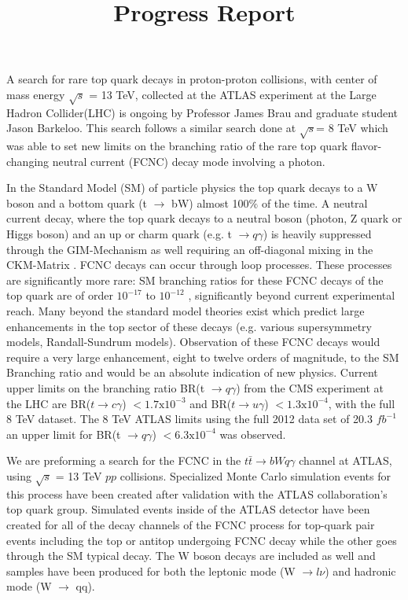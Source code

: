\documentclass[12pt,letterpaper]{article}
\begin{document}
\title{Progress Report}  \date{\vspace{-8ex}}

\maketitle

\par A search for rare top quark decays in proton-proton collisions,  with center of mass energy $\sqrt{s}$ = 13 TeV, collected at the ATLAS experiment at the Large Hadron Collider(LHC) is ongoing by Professor James Brau and graduate student Jason Barkeloo.  This search follows a similar search done at $\sqrt{s}$= 8 TeV which was able to set new limits on the branching ratio of the rare top quark flavor-changing neutral current (FCNC) decay mode involving a photon.

\par In the Standard Model (SM) of particle physics the top quark decays to a W boson and a bottom quark (t $\rightarrow$ bW) almost 100$\%$ of the time. A neutral current decay, where the top quark decays to a neutral boson (photon, Z quark or Higgs boson) and an up or charm quark (e.g. t $\rightarrow q\gamma$) is heavily suppressed through the GIM-Mechanism \cite{gim} as well requiring an off-diagonal mixing in the CKM-Matrix \cite{ckm}.   FCNC decays can occur through loop processes.  These processes are significantly more rare: SM branching ratios for these FCNC decays of the top quark are of order $ 10^{-17}$ to $10^{-12}$ \cite{snowmass}, significantly beyond current experimental reach.  Many beyond the standard model theories exist which predict large enhancements in the top sector of these decays (e.g. various supersymmetry models, Randall-Sundrum models).  Observation of these FCNC decays would require a very large enhancement, eight to twelve orders of magnitude, to the SM Branching ratio and would be an absolute indication of new physics.  Current upper limits on the branching ratio BR(t $\rightarrow q\gamma$) from the CMS experiment at the LHC are BR($t \rightarrow c\gamma$) $< 1.7\text{x}10^{-3}$ and BR($t \rightarrow u\gamma$) $< 1.3\text{x} 10^{-4}$, with the full 8 TeV dataset\cite{cms}.  The 8 TeV ATLAS limits using the full 2012 data set of 20.3 $fb^{-1}$ an upper limit for  BR(t $\rightarrow q\gamma$) $< 6.3\text{x}10^{-4}$ was observed.

\par We are preforming a search for the FCNC in the $t\bar{t} \rightarrow bWq\gamma$ channel at ATLAS, using $\sqrt{s}$ = 13 TeV $pp$ collisions.  Specialized Monte Carlo simulation events for this process have been created after validation with the ATLAS collaboration's top quark group.  Simulated events inside of the ATLAS detector have been created for all of the decay channels of the FCNC process for top-quark pair events including the top or antitop undergoing FCNC decay while the other goes through the SM typical decay.  The W boson decays are included as well and samples have been produced for both the leptonic mode (W $\rightarrow l \nu$) and hadronic mode (W $\rightarrow$ qq).  
\end{document}
